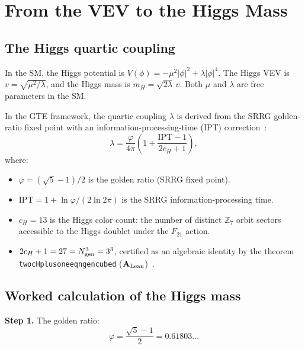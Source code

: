 \documentclass[11pt,a4paper]{article}
\newcommand{\lean}[1]{%
  \penalty-100
  \begingroup\def\_{\textunderscore\allowbreak}\texttt{#1}\endgroup}
\newcommand{\CatAL}{\ensuremath{\mathbf{A}_{\rm Lean}}}
\begin{document}
\section{From the VEV to the Higgs Mass}
\label{sec:mass}

\subsection{The Higgs quartic coupling}

In the SM, the Higgs potential is $V(\phi) = -\mu^2 |\phi|^2 + \lambda |\phi|^4$.
The Higgs VEV is $v = \sqrt{\mu^2/\lambda}$, and the Higgs mass is
$m_H = \sqrt{2\lambda}\, v$.
Both $\mu$ and $\lambda$ are free parameters in the SM.

In the GTE framework, the quartic coupling $\lambda$ is derived from the
SRRG golden-ratio fixed point with an information-processing-time (IPT)
correction~\cite{SpivackGTECompleteFramework}:
\begin{equation}
  \lambda = \frac{\varphi}{4\pi}
  \left(1 + \frac{\mathrm{IPT} - 1}{2c_H + 1}\right),
  \label{eq:lambda}
\end{equation}
where:
\begin{itemize}[itemsep=2pt]
  \item $\varphi = (\sqrt{5}-1)/2$ is the golden ratio (SRRG fixed point).
  \item $\mathrm{IPT} = 1 + \ln\varphi/(2\ln 2\pi)$ is the SRRG
        information-processing time.
  \item $c_H = 13$ is the Higgs color count: the number of distinct
        $\mathbb{Z}_7$ orbit sectors accessible to the Higgs doublet
        under the $F_{21}$ action.
  \item $2c_H + 1 = 27 = N_{\rm gen}^3 = 3^3$, certified as an algebraic
        identity by the theorem \lean{two\_cH\_plus\_one\_eq\_ngen\_cubed}
        (\CatAL)~\cite{SpivackGTECompleteFramework}.
\end{itemize}

\subsection{Worked calculation of the Higgs mass}

\textbf{Step 1.} The golden ratio:
\[
  \varphi = \frac{\sqrt{5}-1}{2} = 0.61803\ldots
\]
\end{document}
